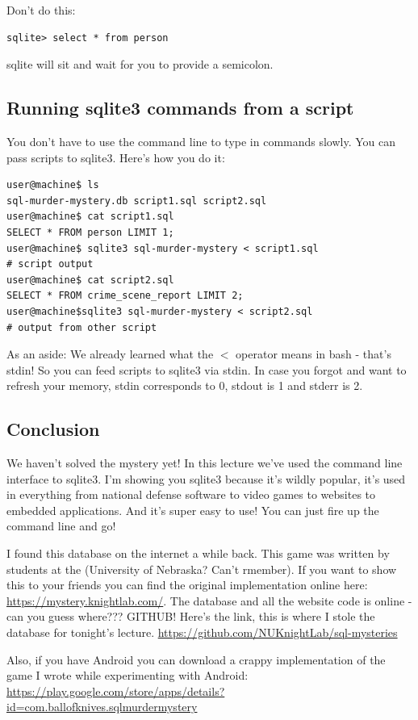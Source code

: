 \documentclass[12pt,a4paper]{article}
\begin{document}
Don't do this:
\begin{lstlisting}[style=term]
sqlite> select * from person
\end{lstlisting}

sqlite will sit and wait for you to provide a semicolon.

\subsection{Running sqlite3 commands from a script}
You don't have to use the command line to type in commands slowly. You can pass
scripts to sqlite3. Here's how you do it:

\begin{lstlisting}[style=term]
user@machine$ ls
sql-murder-mystery.db script1.sql script2.sql
user@machine$ cat script1.sql
SELECT * FROM person LIMIT 1;
user@machine$ sqlite3 sql-murder-mystery < script1.sql
# script output
user@machine$ cat script2.sql
SELECT * FROM crime_scene_report LIMIT 2;
user@machine$sqlite3 sql-murder-mystery	< script2.sql
# output from other script
\end{lstlisting}

As an aside: We already learned what the $<$ operator means in bash - that's stdin! So you
can feed scripts to sqlite3 via stdin. In case you forgot and want to refresh
your memory, stdin corresponds to 0, stdout is 1 and stderr is 2.

\subsection{Conclusion}
We haven't solved the mystery yet! In this lecture we've used the command line
interface to sqlite3. I'm showing you sqlite3 because it's wildly popular, it's
used in everything from national defense software to video games to websites to
embedded applications. And it's super easy to use! You can just fire up the
command line and go!

I found this database on the internet a while back. This game was written by
students at the (University of Nebraska? Can't rmember).
 If you want to show this to your friends you can find
the original implementation online here: \url{https://mystery.knightlab.com/}.
The database and all the website code is online -can you guess where??? GITHUB! 
Here's the link, this is where I stole the database for tonight's lecture.
\url{https://github.com/NUKnightLab/sql-mysteries}

Also, if you have Android you can download a crappy implementation of the game
I wrote while experimenting with Android:
\url{https://play.google.com/store/apps/details?id=com.ballofknives.sqlmurdermystery}
\end{document}
